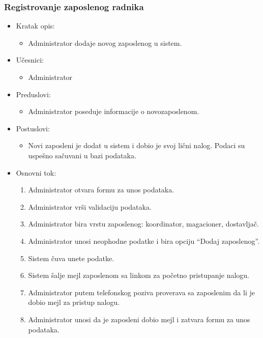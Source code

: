 \subsubsection{Registrovanje zaposlenog radnika}

\begin{itemize}
    \item Kratak opis:
        \begin{itemize}
            \item Administrator dodaje novog zaposlenog u sistem.
        \end{itemize}
    \item Učesnici:
        \begin{itemize}
            \item Administrator
        \end{itemize}
    \item Preduslovi:
        \begin{itemize}
            \item Administrator poseduje informacije o novozaposlenom.
        \end{itemize}
    \item Postuslovi:
        \begin{itemize}
            \item Novi zaposleni je dodat u sistem i dobio je svoj lični nalog. Podaci su uspešno sačuvani u bazi podataka.
        \end{itemize}
    \item Osnovni tok:
        \begin{enumerate}
         \item Administrator otvara formu za unos podataka.
         \item Administrator vrši validaciju podataka.
         \item Administrator bira vrstu zaposlenog: koordinator, magacioner, dostavljač.
         \item Administrator unosi neophodne podatke i bira opciju ``Dodaj zaposlenog''.
         \item Sistem čuva unete podatke.
         \item Sistem šalje mejl zaposlenom sa linkom za početno pristupanje nalogu.
         \item Administrator putem telefonskog poziva proverava sa zaposlenim da li je dobio mejl za pristup nalogu.
         \item Administrator unosi da je zaposleni dobio mejl i zatvara formu za unos podataka.
        \end{enumerate}

\end{itemize}
